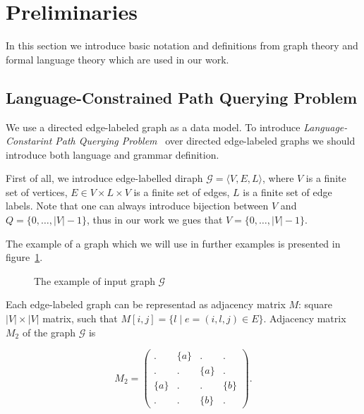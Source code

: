 \section{Preliminaries}

In this section we introduce basic notation and definitions from graph theory and formal language theory which are used in our work.

\subsection{Language-Constrained Path Querying Problem}

We use a directed edge-labeled graph as a data model. 
To introduce \textit{Language-Constarint Path Querying Problem}~\cite{!!!} over directed edge-labeled graphs we should introduce both language and grammar definition.

First of all, we introduce edge-labelled diraph $\mathcal{G} = \langle V,E,L \rangle$, where $V$ is a finite set of vertices, $E \in V \times L \times V$ is a finite set of edges, $L$ is a finite set of edge labels. 
Note that one can always introduce bijection between $V$ and $Q = \{0, \ldots, |V|-1\}$, thus in our work we gues that $V = \{0, \ldots, |V|-1\}$.

The example of a graph which we will use in further examples is presented in figure~\ref{fig:example_input_graph}.

\begin{figure}[h]
    \centering        
    \caption{The example of input graph $\mathcal{G}$}
    \label{fig:example_input_graph}
\end{figure}

Each edge-labeled graph can be representad as adjacency matrix $M$: square $|V|\times|V|$ matrix, such that $M[i,j] = \{l \mid e = (i,l,j) \in E\}$.
Adjacency matrix $M_2$ of the graph $\mathcal{G}$ is 

$$
    M_2 =
    \begin{pmatrix}
    . & \{a\} & . & .     \\
    . & . & \{a\} & .     \\
    \{a\} & . & . & \{b\} \\
    . & . & \{b\} & .
    \end{pmatrix}.
$$


